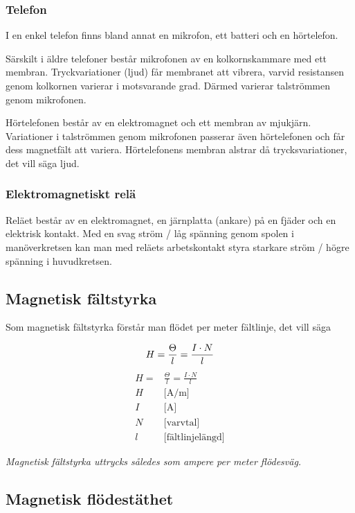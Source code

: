 \subsubsection{Telefon}
I en enkel telefon finns bland annat en mikrofon, ett batteri och en
hörtelefon.

Särskilt i äldre telefoner består mikrofonen av en kolkornskammare med ett
membran.
Tryckvariationer (ljud) får membranet att vibrera, varvid resistansen genom
kolkornen varierar i motsvarande grad.
Därmed varierar talströmmen genom mikrofonen.

Hörtelefonen består av en elektromagnet och ett membran av mjukjärn.
Variationer i talströmmen genom mikrofonen passerar även hörtelefonen och får dess
magnetfält att variera.
Hörtelefonens membran alstrar då trycksvariationer, det vill säga ljud.

\subsubsection{Elektromagnetiskt relä}
Reläet består av en elektromagnet, en järnplatta (ankare) på en fjäder och en
elektrisk kontakt.
Med en svag ström / låg spänning genom spolen i manöverkretsen kan man med
reläets arbetskontakt styra starkare ström / högre spänning i huvudkretsen.

\subsection{Magnetisk fältstyrka}

Som magnetisk fältstyrka förstår man flödet per meter fältlinje, det vill säga

\begin{equation*}
  H = \frac{\Theta}{l} = \frac{I \cdot N}{l} \\
\end{equation*}
%
\begin{align*}
  H =& \frac{\Theta}{l} = \frac{I \cdot N}{l} \\
  H\ &\text{[A/m]} \\
  I\ &\text{[A]} \\
  N\ &\text{[varvtal]} \\
  l\ &\text{[fältlinjelängd]}
\end{align*}

\emph{Magnetisk fältstyrka uttrycks således som ampere per meter flödesväg.}

\subsection{Magnetisk flödestäthet}

